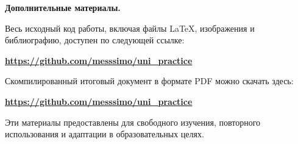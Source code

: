 \documentclass[a4paper,12pt]{report}
\newcommand{\github}{\url{https://github.com/messsimo/uni_practice}}
\newcommand{\pdfLink}{\url{https://github.com/messsimo/uni_practice}}
\begin{document}
\textbf{Дополнительные материалы.}

Весь исходный код работы, включая файлы \LaTeX{}, изображения и библиографию, доступен по следующей ссылке:
\begin{center}
\textbf{\github}
\end{center}

Скомпилированный итоговый документ в формате PDF можно скачать здесь:
\begin{center}
\textbf{\pdfLink}
\end{center}

\noindent Эти материалы предоставлены для свободного изучения, повторного использования и адаптации в образовательных целях.


\bibliographyChapter 

\end{document}
